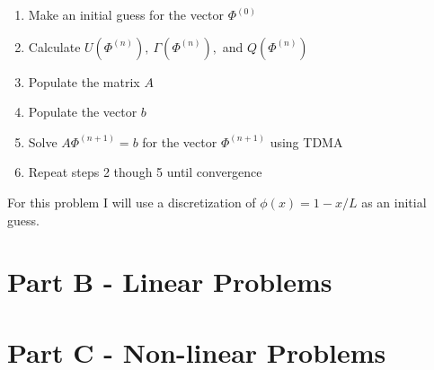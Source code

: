 \documentclass[reqno]{amsart}
\begin{document}
    \begin{enumerate}
        \item Make an initial guess for the vector $\Phi^{(0)}$
        \item Calculate $U(\Phi^{(n)}),\ \Gamma(\Phi^{(n)}),$ and $Q(\Phi^{(n)})$
        \item Populate the matrix $A$
        \item Populate the vector $b$
        \item Solve $A\Phi^{(n+1)} = b$ for the vector $\Phi^{(n+1)}$ using TDMA
        \item Repeat steps 2 though 5 until convergence
    \end{enumerate}
    For this problem I will use a discretization of $\phi(x) = 1 - x/L$ as an initial guess.
    \section{Part B - Linear Problems}

    \section{Part C - Non-linear Problems}
\end{document}
